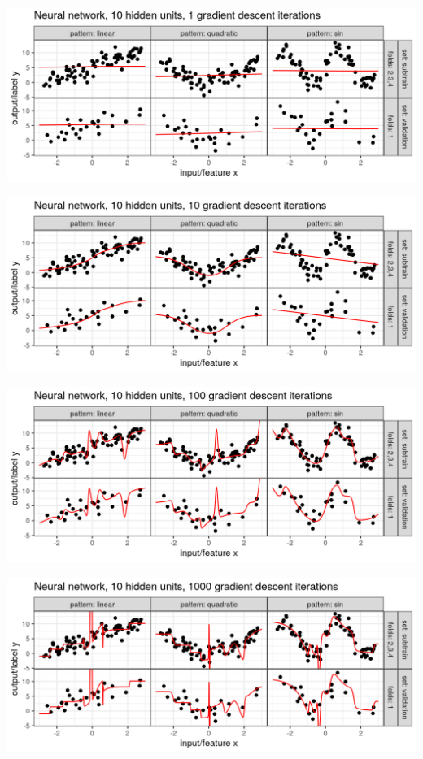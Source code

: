 
\begin{frame}
  \includegraphics[width=\textwidth]{figure-overfitting-pred-units=10-maxit=1.png}
\end{frame}


\begin{frame}
  \includegraphics[width=\textwidth]{figure-overfitting-pred-units=10-maxit=10.png}
\end{frame}


\begin{frame}
  \includegraphics[width=\textwidth]{figure-overfitting-pred-units=10-maxit=100.png}
\end{frame}


\begin{frame}
  \includegraphics[width=\textwidth]{figure-overfitting-pred-units=10-maxit=1000.png}
\end{frame}


